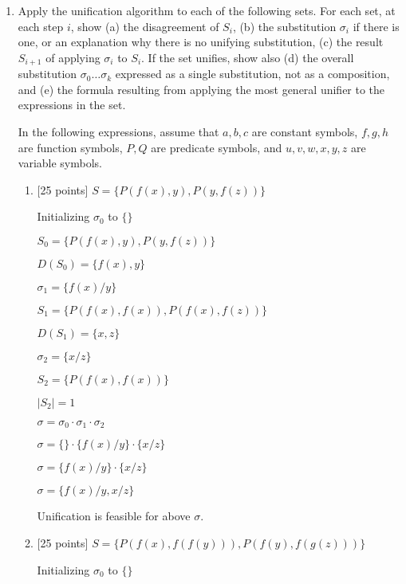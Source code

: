 \documentclass{article}
\begin{document}
\begin{enumerate}

\item Apply the unification algorithm to each of the following sets.
  For each set, at each step $i$, show (a) the disagreement of $S_i$,
  (b) the substitution $\sigma_i$ if there is one, or an explanation
  why there is no unifying substitution, (c) the result $S_{i+1}$ of
  applying $\sigma_i$ to $S_i$.  If the set unifies, show also (d) the
  overall substitution $\sigma_0 \dots \sigma_k$ expressed as a single
  substitution, not as a composition, and (e) the formula resulting
  from applying the most general unifier to the expressions in the
  set.

  In the following expressions, assume that $a,b,c$ are constant
  symbols, $f,g,h$ are function symbols, $P,Q$ are predicate symbols,
  and $u,v,w,x,y,z$ are variable symbols.

  \begin{enumerate}
  \item {[25 points]}
    $S = \{ P(f(x),y), P(y,f(z)) \}$
    \begin{answer}
		Initializing $\sigma_0$ to $\{\}$
		
		$S_0 = \{ P(f(x),y), P(y,f(z)) \}$
		
		$D(S_0) = \{f(x), y\}$
		\bigskip
		
		$\sigma_1 = \{f(x)/y\}$
		
		$S_1 = \{ P(f(x),f(x)), P(f(x),f(z)) \}$
		
		$D(S_1) = \{x, z\}$
		\bigskip
		
		$\sigma_2 = \{x/z\}$

		$S_2 = \{ P(f(x), f(x))\}$

		$|S_2| = 1$		
		\bigskip
		
		$\sigma = \sigma_0 \cdot{} \sigma_1 \cdot{} \sigma_2$
		
		$\sigma = \{\} \cdot{} \{f(x)/y\} \cdot{} \{x/z\}$
		
		$\sigma = \{f(x)/y\} \cdot{} \{x/z\}$
		
		$\sigma = \{f(x)/y, x/z\}$
		
		Unification is feasible for above $\sigma$.
    \end{answer}
    
  \item {[25 points]}
    $S = \{ P(f(x),f(f(y))), P(f(y),f(g(z))) \}$
    
    \begin{answer}
    	Initializing $\sigma_0$ to $\{\}$
    	

\end{answer}
\end{enumerate}
\end{enumerate}
\end{document}
